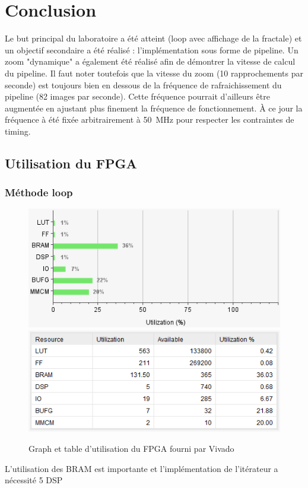 \documentclass[LPSC_Labo03_SDeriaz]{subfiles}
\begin{document}
\section{Conclusion}
Le but principal du laboratoire a été atteint (loop avec affichage de la fractale) et un objectif secondaire a été réalisé : l'implémentation sous forme de pipeline. Un zoom "dynamique" a également été réalisé afin de démontrer la vitesse de calcul du pipeline. Il faut noter toutefois que la vitesse du zoom (10 rapprochements par seconde) est toujours bien en dessous de la fréquence de rafraichissement du pipeline (82 images par seconde). Cette fréquence pourrait d'ailleurs être augmentée en ajustant plus finement la fréquence de fonctionnement. À ce jour la fréquence à été fixée arbitrairement à \SI{50}{\mega\hertz} pour respecter les contraintes de timing.
\subsection{Utilisation du FPGA}
\subsubsection{Méthode loop}
\begin{figure}[H]
\centering
\includegraphics[scale=0.5]{utilisation_graph_loop.png}
\includegraphics[scale=0.5]{utilisation_table_loop.png}
\caption{Graph et table d'utilisation du FPGA fourni par Vivado}
\end{figure}
L'utilisation des BRAM est importante et l'implémentation de l'itérateur a nécessité 5 DSP
\end{document}
